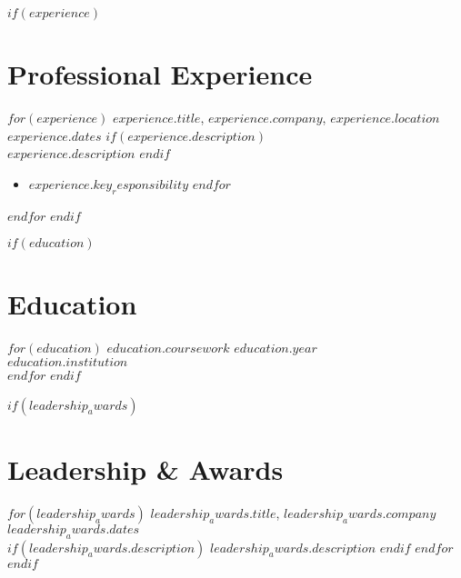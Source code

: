\documentclass[11pt]{article}
\newcommand{\jobheader}[4]{\noindent\textbf{#1}, \textit{#2}, #3 \hfill \textbf{#4}\vspace{0.1em}}
\newenvironment{subcompactitemize}
{\begin{itemize}[leftmargin=1.5em,itemsep=0.15em,topsep=0.1em,parsep=0em,partopsep=0em]}
{\end{itemize}}
\begin{document}
$if(experience)$
\section{Professional Experience}
$for(experience)$
\jobheader{$experience.title$}{$experience.company$}{$experience.location$}{$experience.dates$}
$if(experience.description)$
\\
\textit{$experience.description$}\vspace{0.1em}
$endif$
\begin{subcompactitemize}
$for(experience.key_responsibility)$
\item $experience.key_responsibility$
$endfor$
\end{subcompactitemize}
\vspace{0.3em}
$endfor$
$endif$

$if(education)$
\section{Education}
$for(education)$
\noindent\textbf{$education.coursework$} \hfill $education.year$ \\
\textit{$education.institution$}\\
\vspace{0.1em}
$endfor$
$endif$

$if(leadership_awards)$
\section{Leadership \& Awards}
$for(leadership_awards)$
\noindent\textbf{$leadership_awards.title$}, \textit{$leadership_awards.company$} \hfill $leadership_awards.dates$ \\
$if(leadership_awards.description)$
$leadership_awards.description$
$endif$
\vspace{0.1em}
$endfor$
$endif$
\end{document}
